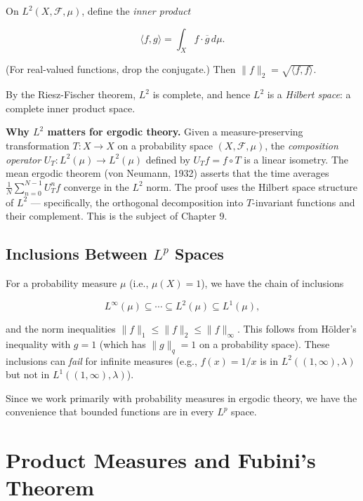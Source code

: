 \begin{definition}\label{def:7.31.}
On $L^2(X, \mathcal{F}, \mu)$, define the \textit{inner product}

\[
\langle f, g \rangle = \int_X f \cdot \overline{g} \, d\mu.
\]

(For real-valued functions, drop the conjugate.) Then $\|f\|_2 = \sqrt{\langle f, f \rangle}$.

By the Riesz-Fischer theorem, $L^2$ is complete, and hence $L^2$ is a \textit{Hilbert space}: a complete inner product space.

\textbf{Why $L^2$ matters for ergodic theory.} Given a measure-preserving transformation $T: X \to X$ on a probability space $(X, \mathcal{F}, \mu)$, the \textit{composition operator} $U_T: L^2(\mu) \to L^2(\mu)$ defined by $U_T f = f \circ T$ is a linear isometry. The mean ergodic theorem (von Neumann, 1932) asserts that the time averages $\frac{1}{N} \sum_{n=0}^{N-1} U_T^n f$ converge in the $L^2$ norm. The proof uses the Hilbert space structure of $L^2$ --- specifically, the orthogonal decomposition into $T$-invariant functions and their complement. This is the subject of Chapter 9.
\end{definition}


\subsection{Inclusions Between $L^p$ Spaces}\label{sec:7.5.4}

For a probability measure $\mu$ (i.e., $\mu(X) = 1$), we have the chain of inclusions

\[
L^\infty(\mu) \subseteq \cdots \subseteq L^2(\mu) \subseteq L^1(\mu),
\]

and the norm inequalities $\|f\|_1 \leq \|f\|_2 \leq \|f\|_\infty$. This follows from H\"{o}lder's inequality with $g = 1$ (which has $\|g\|_q = 1$ on a probability space). These inclusions can \textit{fail} for infinite measures (e.g., $f(x) = 1/x$ is in $L^2((1,\infty), \lambda)$ but not in $L^1((1,\infty), \lambda)$).

Since we work primarily with probability measures in ergodic theory, we have the convenience that bounded functions are in every $L^p$ space.


\bigskip


\section{Product Measures and Fubini's Theorem}\label{sec:7.6}

